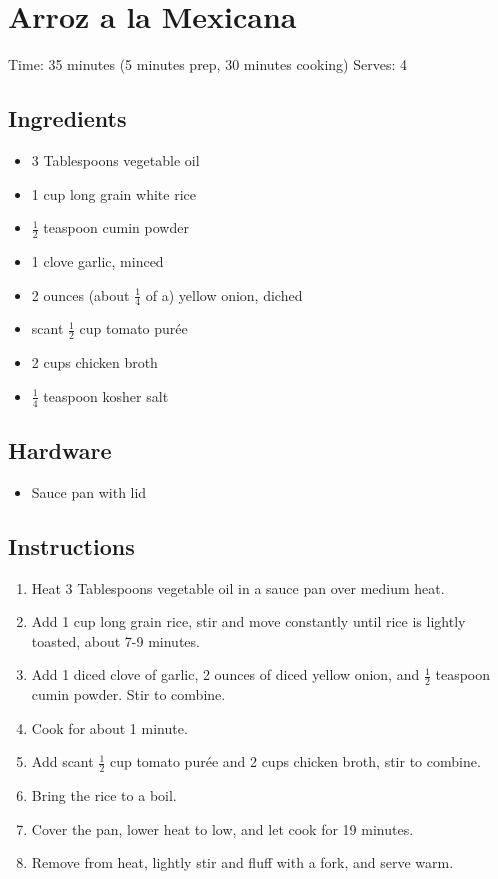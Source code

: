 \section{Arroz a la Mexicana}
\label{arrozALaMexicana}
\setcounter{secnumdepth}{0}
Time: 35 minutes (5 minutes prep, 30 minutes cooking)
Serves: 4

\begin{multicols}{2}
\subsection*{Ingredients}
\begin{itemize}
    \item 3 Tablespoons vegetable oil
    \item 1 cup long grain white rice
    \item \( \frac{1}{2} \) teaspoon cumin powder
    \item 1 clove garlic, minced
    \item 2 ounces (about \( \frac{1}{4} \) of a) yellow onion, diched
    \item scant \( \frac{1}{2} \) cup tomato purée
    \item 2 cups chicken broth
    \item \( \frac{1}{4} \) teaspoon kosher salt
\end{itemize}

\subsection*{Hardware}
\begin{itemize}
    \item Sauce pan with lid
\end{itemize}
\clearpage

\subsection*{Instructions}
\begin{enumerate}
    \item Heat 3 Tablespoons vegetable oil in a sauce pan over medium heat.
    \item Add 1 cup long grain rice, stir and move constantly until rice is lightly toasted, about 7-9 minutes.
    \item Add 1 diced clove of garlic, 2 ounces of diced yellow onion, and \( \frac{1}{2} \) teaspoon cumin powder. Stir to combine.
    \item Cook for about 1 minute.
    \item Add scant \( \frac{1}{2} \) cup tomato purée and 2 cups chicken broth, stir to combine.
    \item Bring the rice to a boil.
    \item Cover the pan, lower heat to low, and let cook for 19 minutes.
    \item Remove from heat, lightly stir and fluff with a fork, and serve warm.
\end{enumerate}


\end{multicols}
